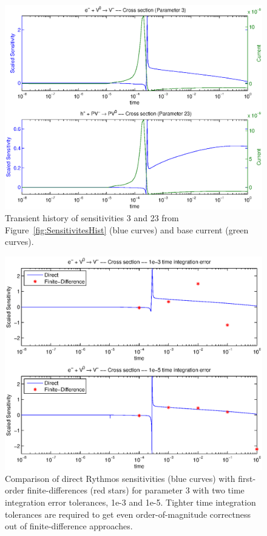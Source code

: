 \documentclass[pdf,ps2pdf,11pt]{SANDreport}
\begin{document}
{\bsinglespace
\begin{figure}[p]
\begin{center}
\includegraphics*[width=5in]{sensitivities_full_report_1}
\end{center}
\caption[Transient history of two scaled sensitivities]{
\label{fig:SensitivitesFull}
Transient history of sensitivities 3 and 23 from 
Figure~\ref{fig:SensitivitesHist} (blue curves) and base current (green curves).}

\end{figure}
\esinglespace}

{\bsinglespace
\begin{figure}[p]
\begin{center}
\includegraphics*[width=5in]{sensitivity_conv}
\end{center}
\caption[Comparison of direct and finite-difference sensitivities]{
\label{fig:SensitivitesFD}
Comparison of direct Rythmos sensitivities (blue curves) with first-order finite-differences (red stars) for parameter 3 with two time integration error tolerances, 1e-3 and 1e-5.  Tighter time integration tolerances are required to get even order-of-magnitude correctness out of finite-difference approaches.}
\end{figure}
\esinglespace}
\end{document}
